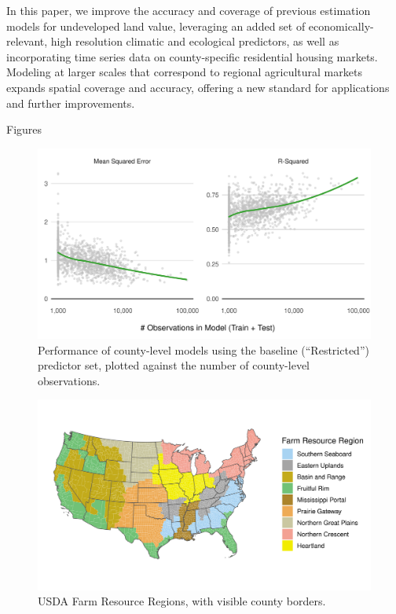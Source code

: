 \documentclass[12pt]{article}
\begin{document}
In this paper, we improve the accuracy and coverage of previous estimation models for undeveloped land value, leveraging an added set of economically-relevant, high resolution climatic and ecological predictors, as well as incorporating time series data on county-specific residential housing markets. Modeling at larger scales that correspond to regional agricultural markets expands spatial coverage and accuracy, offering a new standard for applications and further improvements. 

\newpage

\vspace*{200pt}

\begin{huge}
    \begin{center}
        Figures
    \end{center}
\end{huge}

\newpage

\begin{figure}[H]
    \centering
    \includegraphics[width=1\textwidth]{exhibits/compare_county_nobs_perf.png}
    \caption{Performance of county-level models using the baseline (``Restricted'') predictor set, plotted against the number of county-level observations.}
    \label{fig:compare_county_nobs_perf}
\end{figure}

\begin{figure}[H]
    \centering
    \includegraphics[width=1\textwidth]{exhibits/FRR_map.png}
    \caption{USDA Farm Resource Regions, with visible county borders.}
    \label{fig:FRR_map}
\end{figure}
\end{document}
